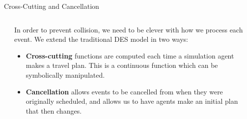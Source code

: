 \documentclass[aspectratio=1610,mathserif]{beamer}
\begin{document}
\begin{frame}{Cross-Cutting and Cancellation}
    \begin{columns}
        \begin{column}{0.4\textwidth}
        \end{column}
        \begin{column}{0.6\textwidth}
            In order to prevent collision, we need to be clever with how we
            process each event. We extend the traditional DES model in two ways:
            \begin{itemize}
                \item \textbf{Cross-cutting} functions are computed each time a
                    simulation agent makes a travel plan. This is a continuous
                    function which can be symbolically manipulated.
                \item \textbf{Cancellation} allows events to be cancelled from
                    when they were originally scheduled, and allows us to have
                    agents make an initial plan that then changes.
            \end{itemize}
        \end{column}
    \end{columns}
\end{frame}
\end{document}
